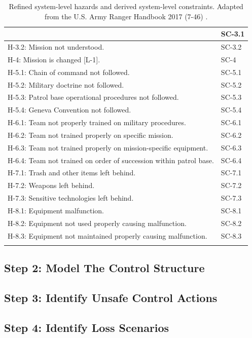 \documentclass[../../main/main.tex]{subfiles}
\begin{document}
\begin{longtable}[h]{ | m{7.5cm} |  m{7.5cm} | }
& 
SC-3.1 \\
\hline
H-3.2: Mission not understood.
& 
SC-3.2 \\
\hline
H-4: Mission is changed [L-1].
& 
SC-4\\
\hline
 H-5.1: Chain of command not followed.
 & 
SC-5.1\\
\hline
H-5.2: Military doctrine not followed.
 & 
SC-5.2\\
\hline
H-5.3: Patrol base operational procedures not followed.
 & 
SC-5.3\\
\hline
H-5.4: Geneva Convention not followed.
 & 
SC-5.4\\
\hline
H-6.1: Team not properly trained on military procedures.
 & 
SC-6.1\\
\hline
H-6.2: Team not trained properly on specific mission.
 & 
SC-6.2\\
\hline
H-6.3: Team not trained properly on mission-specific equipment.
 & 
SC-6.3\\
\hline
H-6.4: Team not trained on order of succession within patrol base.
 & 
SC-6.4\\
\hline
H-7.1: Trash and other items left behind.
 & 
SC-7.1\\
\hline
H-7.2: Weapons left behind.
 & 
SC-7.2\\
\hline
H-7.3: Sensitive technologies left behind.
 & 
SC-7.3\\
\hline

H-8.1: Equipment malfunction.
 & 
SC-8.1\\
\hline
H-8.2: Equipment not used properly causing malfunction.
 & 
SC-8.2\\
\hline
H-8.3: Equipment not maintained properly causing malfunction.
 & 
SC-8.3\\
\hline

\caption{Refined system-level hazards and derived system-level constraints.  Adapted from the U.S. Army Ranger Handbook 2017 (7-46) \cite{rangermanual}\label{slconstraints}.}\\

\end{longtable}
\parskip=18pt


\subsection{Step 2: Model The Control Structure}


\subsection{Step 3: Identify Unsafe Control Actions}
\subsection{Step 4: Identify Loss Scenarios}
\end{document}
